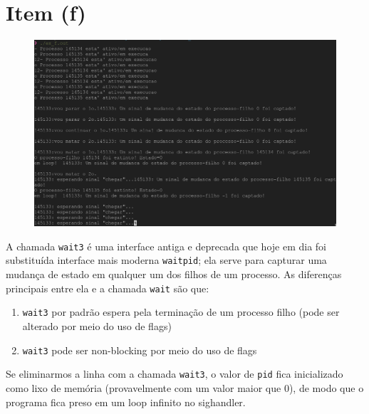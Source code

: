 \documentclass{article}
\begin{document}
\newpage
\section*{Item (f)}
\begin{figure}[!ht]
    \begin{center}
        \includegraphics[width=\textwidth]{images/item_f.png}
    \end{center}
\end{figure} 
\FloatBarrier

A chamada \texttt{wait3} é uma interface antiga e deprecada que hoje em dia foi substituída interface mais moderna \texttt{waitpid}; ela serve para capturar uma mudança de estado em qualquer um dos filhos de um processo. As diferenças principais entre ela e a chamada \texttt{wait} são que:

\begin{enumerate}
    \item \texttt{wait3} por padrão espera pela terminação de um processo filho (pode ser alterado por meio do uso de flags)
    \item \texttt{wait3} pode ser non-blocking por meio do uso de flags
\end{enumerate}

Se eliminarmos a linha com a chamada \texttt{wait3}, o valor de \texttt{pid} fica inicializado como lixo de memória (provavelmente com um valor maior que 0), de modo que o programa fica preso em um loop infinito no sighandler.
\end{document}
